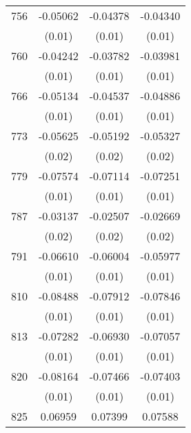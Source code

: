 \begin{table}[htbp]
\begin{tabular}{l*{3}{c}}
756                 &    -0.05062\sym{***}&    -0.04378\sym{***}&    -0.04340\sym{***}\\
                    &      (0.01)         &      (0.01)         &      (0.01)         \\
760                 &    -0.04242\sym{***}&    -0.03782\sym{**} &    -0.03981\sym{**} \\
                    &      (0.01)         &      (0.01)         &      (0.01)         \\
766                 &    -0.05134\sym{***}&    -0.04537\sym{***}&    -0.04886\sym{***}\\
                    &      (0.01)         &      (0.01)         &      (0.01)         \\
773                 &    -0.05625\sym{*}  &    -0.05192\sym{*}  &    -0.05327\sym{*}  \\
                    &      (0.02)         &      (0.02)         &      (0.02)         \\
779                 &    -0.07574\sym{***}&    -0.07114\sym{***}&    -0.07251\sym{***}\\
                    &      (0.01)         &      (0.01)         &      (0.01)         \\
787                 &    -0.03137\sym{*}  &    -0.02507         &    -0.02669         \\
                    &      (0.02)         &      (0.02)         &      (0.02)         \\
791                 &    -0.06610\sym{***}&    -0.06004\sym{***}&    -0.05977\sym{***}\\
                    &      (0.01)         &      (0.01)         &      (0.01)         \\
810                 &    -0.08488\sym{***}&    -0.07912\sym{***}&    -0.07846\sym{***}\\
                    &      (0.01)         &      (0.01)         &      (0.01)         \\
813                 &    -0.07282\sym{***}&    -0.06930\sym{***}&    -0.07057\sym{***}\\
                    &      (0.01)         &      (0.01)         &      (0.01)         \\
820                 &    -0.08164\sym{***}&    -0.07466\sym{***}&    -0.07403\sym{***}\\
                    &      (0.01)         &      (0.01)         &      (0.01)         \\
825                 &     0.06959         &     0.07399         &     0.07588         \\

\end{tabular}
\end{table}
